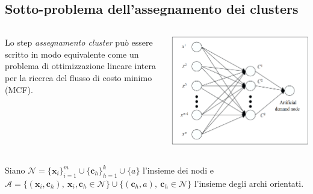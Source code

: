 \documentclass{beamer}
\begin{document}
\subsection{Sotto-problema dell'assegnamento dei clusters}
\begin{frame}
	\begin{columns}
		\begin{column}{0.5\textwidth}
			Lo step \textit{assegnamento cluster} può essere scritto in modo equivalente come un problema di ottimizzazione lineare intera per la ricerca del flusso di costo minimo (MCF).  
		\end{column}
		\begin{column}{0.5\textwidth}
			\begin{center}
				\includegraphics[width=1\textwidth]{MCF.png}      
			\end{center}
		\end{column}
	\end{columns}
	\vspace{0.3cm}
	Siano $\mathcal{N} = \{\textbf{x}_i\}_{i=1}^m \cup \{\textbf{c}_h\}_{h=1}^k \cup \{a\}$ l'insieme dei nodi e $\mathcal{A} = \{(\textbf{x}_i,\textbf{c}_h), \ \textbf{x}_i,\textbf{c}_h \in \mathcal{N}\} \cup \{(\textbf{c}_h, a), \ \textbf{c}_h \in \mathcal{N}\}$ l'insieme degli archi orientati. 	
\end{frame}
\end{document}
